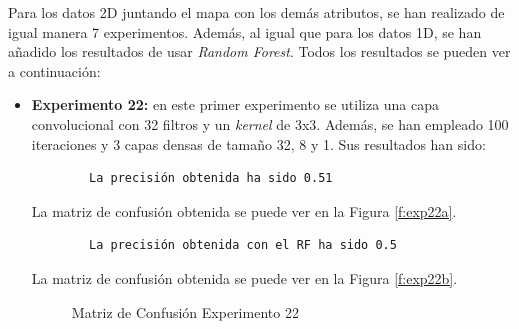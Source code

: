 Para los datos 2D juntando el mapa con los demás atributos, se han realizado de igual manera 7 experimentos. Además, al igual que para los datos 1D, se han añadido los resultados de usar \emph{Random Forest}. Todos los resultados se pueden ver a continuación:
\begin{itemize}
    \item \textbf{Experimento 22:} en este primer experimento se utiliza una capa convolucional con 32 filtros y un \emph{kernel} de 3x3. Además, se han empleado 100 iteraciones y 3 capas densas de tamaño 32, 8 y 1. Sus resultados han sido: 
    \begin{verbatim}
        La precisión obtenida ha sido 0.51
    \end{verbatim}
    La matriz de confusión obtenida se puede ver en la Figura \ref{f:exp22a}.
    \begin{verbatim}
        La precisión obtenida con el RF ha sido 0.5
    \end{verbatim}
    La matriz de confusión obtenida se puede ver en la Figura \ref{f:exp22b}.
    \begin{figure}[h]
     \centering
     \caption{Matriz de Confusión Experimento 22}
     \label{f:exp22}
    \end{figure}    
    

\end{itemize}

